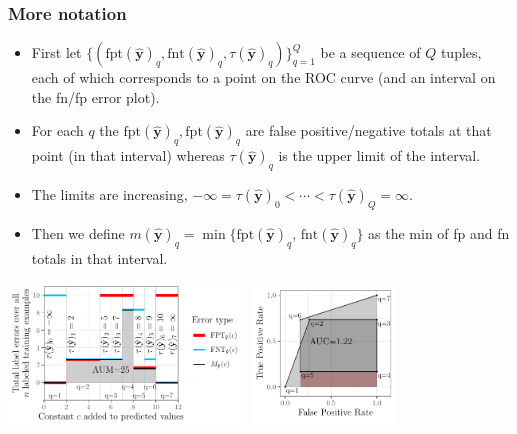 \documentclass[t]{beamer}
\begin{document}
\begin{frame}
  \frametitle{More notation}
  \begin{itemize}
  \item   First let $\{(
\text{fpt}
(\mathbf {\hat y})
_q, \text{fnt}
(\mathbf {\hat y})
_q,
 \tau
(\mathbf {\hat y})
_q
)\}_{q=1}^Q$ 
be a sequence of $Q$ tuples, each of which corresponds to a point on the ROC curve (and an interval on the fn/fp error plot). 
\item For each $q$ the
  $\text{fpt}(\mathbf {\hat y})_q, \text{fpt}(\mathbf {\hat y})_q$ are
  false positive/negative totals at that point (in that interval) whereas
  $\tau(\mathbf {\hat y})_q$ is the upper limit of the interval.
\item The limits are increasing, $ -\infty = \tau
(\mathbf {\hat y})
_0 < \cdots <  \tau
(\mathbf {\hat y})
_Q = \infty$.
\item Then we define $m(\mathbf {\hat y})_q = \min\{
    \text{fpt}(\mathbf {\hat y})_q , \, 
    \text{fnt}(\mathbf {\hat y})_q
\}$ as the min of fp and fn totals in that interval.
  \end{itemize}

  \includegraphics[height=1.5in]{figure-more-than-one-more-aum}
  \includegraphics[height=1.5in]{figure-more-than-one-more-auc}

\end{frame}
\end{document}

